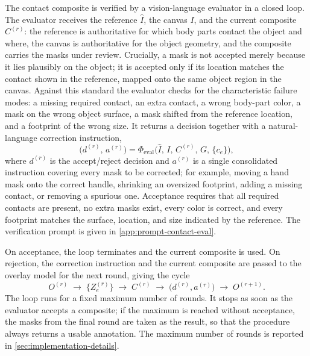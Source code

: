 The contact composite is verified by a vision-language evaluator in a closed loop. The evaluator receives the reference $\hat{I}$, the canvas $I$, and the current composite $C^{(r)}$: the reference is authoritative for which body parts contact the object and where, the canvas is authoritative for the object geometry, and the composite carries the masks under review. Crucially, a mask is not accepted merely because it lies plausibly on the object; it is accepted only if its location matches the contact shown in the reference, mapped onto the same object region in the canvas. Against this standard the evaluator checks for the characteristic failure modes: a missing required contact, an extra contact, a wrong body-part color, a mask on the wrong object surface, a mask shifted from the reference location, and a footprint of the wrong size. It returns a decision together with a natural-language correction instruction,
\begin{equation}
\label{eq:vlm-contact-eval}
\bigl( d^{(r)},\, a^{(r)} \bigr) = \Phi_{\mathrm{eval}}\bigl( \hat{I},\, I,\, C^{(r)},\, G,\, \{c_e\} \bigr),
\end{equation}
where $d^{(r)}$ is the accept/reject decision and $a^{(r)}$ is a single consolidated instruction covering every mask to be corrected; for example, moving a hand mask onto the correct handle, shrinking an oversized footprint, adding a missing contact, or removing a spurious one. Acceptance requires that all required contacts are present, no extra masks exist, every color is correct, and every footprint matches the surface, location, and size indicated by the reference. The verification prompt is given in \cref{app:prompt-contact-eval}.

On acceptance, the loop terminates and the current composite is used. On rejection, the correction instruction and the current composite are passed to the overlay model for the next round, giving the cycle
\begin{equation}
\label{eq:agentic-contact-loop}
O^{(r)} \;\rightarrow\; \{ Z_e^{(r)} \} \;\rightarrow\; C^{(r)} \;\rightarrow\; \bigl( d^{(r)}, a^{(r)} \bigr) \;\rightarrow\; O^{(r+1)}.
\end{equation}
The loop runs for a fixed maximum number of rounds. It stops as soon as the evaluator accepts a composite; if the maximum is reached without acceptance, the masks from the final round are taken as the result, so that the procedure always returns a usable annotation. The maximum number of rounds is reported in \cref{sec:implementation-details}.

